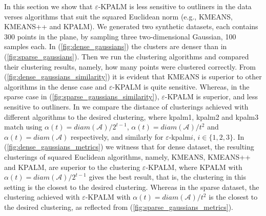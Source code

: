 \documentclass[12pt]{article}
\numberwithin{equation}{section}
\begin{document}
In this section we show that $\varepsilon$-KPALM is less sensitive to outliners in the data verses algorithms that suit the squared Euclidean norm (e.g., KMEANS, KMEANS++ and KPALM). We generated two synthetic datasets, each contains 300 points in the plane, by sampling three two-dimensional Gaussian, 100 samples each. In (\ref{fig:dense_gaussians}) the clusters are denser than in (\ref{fig:sparse_gaussians}).
Then we run the clustering algorithms and compared their clustering results, namely, how many points were clustered correctly. From (\ref{fig:dense_gaussians_similarity}) it is evident that KMEANS is superior to other algorithms in the dense case and $\varepsilon$-KPALM is quite sensitive. Whereas, in the sparse case in (\ref{fig:sparse_gaussians_similarity}), $\varepsilon$-KPALM is superior, and less sensitive to outliners. In  we compare the distance of clusterings achieved with different algorithms to the desired clustering, where kpalm1, kpalm2 and kpalm3 match using $\alpha(t)=diam(\mathcal{A})/2^{t-1}$, $\alpha(t)=diam(\mathcal{A})/t^2$ and $\alpha(t)=diam(\mathcal{A})$ respectively, and similarly for $\varepsilon$-kpalm$i$, $i \in \{1,2,3\}$. In (\ref{fig:dense_gaussians_metrics}) we witness that for dense dataset, the resulting clusterings of squared Euclidean algorithms, namely, KMEANS, KMEANS++ and KPALM, are superior to the clustering $\varepsilon$-KPALM, where KPALM with $\alpha(t)=diam(\mathcal{A})/2^{t-1}$ gives the best result, that is, the clustering in this setting is the closest to the desired clustering. Whereas in the sparse dataset, the clustering achieved with $\varepsilon$-KPALM with $\alpha(t)=diam(\mathcal{A})/t^2$ is the closest to the desired clustering, as reflected from (\ref{fig:sparse_gaussians_metrics}).
\end{document}
